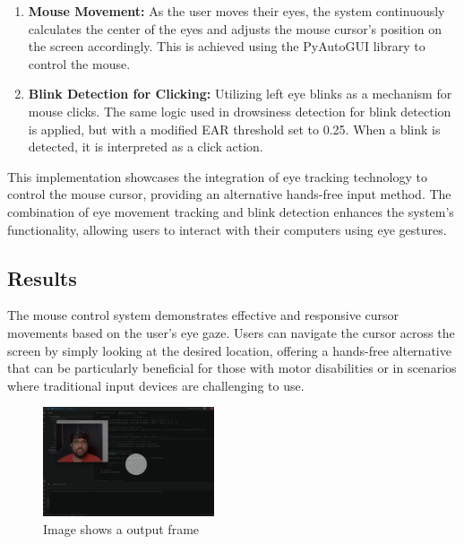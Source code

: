 \documentclass[letterpaper, 10 pt, conference]{ieeeconf}  %
\begin{document}
\begin{enumerate}
    \item \textbf{Mouse Movement:} As the user moves their eyes, the system continuously calculates the center of the eyes and adjusts the mouse cursor's position on the screen accordingly. This is achieved using the PyAutoGUI library to control the mouse.

    \item \textbf{Blink Detection for Clicking:} Utilizing left eye blinks as a mechanism for mouse clicks. The same logic used in drowsiness detection for blink detection is applied, but with a modified EAR threshold set to 0.25. When a blink is detected, it is interpreted as a click action.

\end{enumerate}

This implementation showcases the integration of eye tracking technology to control the mouse cursor, providing an alternative hands-free input method. The combination of eye movement tracking and blink detection enhances the system's functionality, allowing users to interact with their computers using eye gestures.



\subsection{Results}

The mouse control system demonstrates effective and responsive cursor movements based on the user's eye gaze. Users can navigate the cursor across the screen by simply looking at the desired location, offering a hands-free alternative that can be particularly beneficial for those with motor disabilities or in scenarios where traditional input devices are challenging to use.

\begin{figure}
  \centering
  \includegraphics[width=0.45\textwidth]{Mouse1.png} %
  \caption{Image shows a output frame }
  \label{fig:your_label}
\end{figure}
\end{document}
